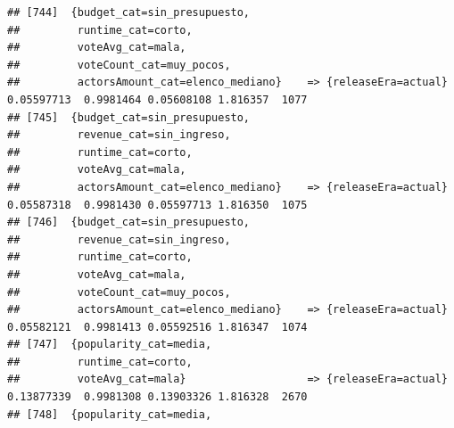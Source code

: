 \documentclass[
]{article}
\begin{document}
\begin{verbatim}
## [744]  {budget_cat=sin_presupuesto,                                                                                             
##         runtime_cat=corto,                                                                                                      
##         voteAvg_cat=mala,                                                                                                       
##         voteCount_cat=muy_pocos,                                                                                                
##         actorsAmount_cat=elenco_mediano}    => {releaseEra=actual}               0.05597713  0.9981464 0.05608108 1.816357  1077
## [745]  {budget_cat=sin_presupuesto,                                                                                             
##         revenue_cat=sin_ingreso,                                                                                                
##         runtime_cat=corto,                                                                                                      
##         voteAvg_cat=mala,                                                                                                       
##         actorsAmount_cat=elenco_mediano}    => {releaseEra=actual}               0.05587318  0.9981430 0.05597713 1.816350  1075
## [746]  {budget_cat=sin_presupuesto,                                                                                             
##         revenue_cat=sin_ingreso,                                                                                                
##         runtime_cat=corto,                                                                                                      
##         voteAvg_cat=mala,                                                                                                       
##         voteCount_cat=muy_pocos,                                                                                                
##         actorsAmount_cat=elenco_mediano}    => {releaseEra=actual}               0.05582121  0.9981413 0.05592516 1.816347  1074
## [747]  {popularity_cat=media,                                                                                                   
##         runtime_cat=corto,                                                                                                      
##         voteAvg_cat=mala}                   => {releaseEra=actual}               0.13877339  0.9981308 0.13903326 1.816328  2670
## [748]  {popularity_cat=media,                                                                                                   

\end{verbatim}
\end{document}
